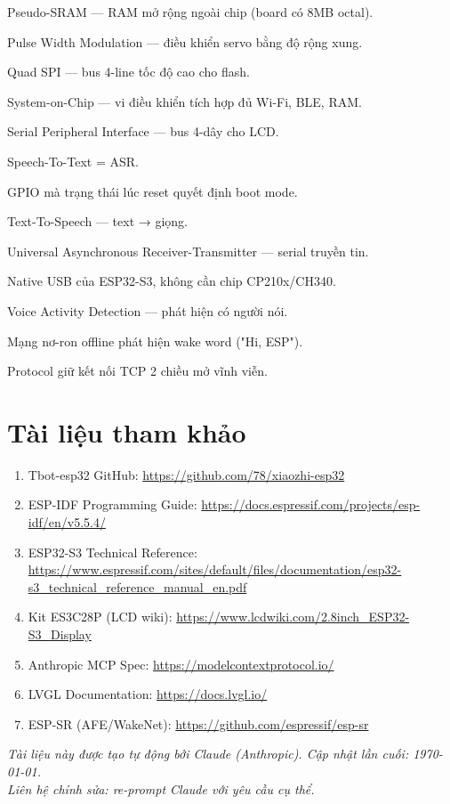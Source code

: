 \documentclass[11pt,a4paper]{article}
\begin{document}
\begin{description}[leftmargin=2.4cm,style=nextline]
  \item[PSRAM] Pseudo-SRAM — RAM mở rộng ngoài chip (board có 8MB octal).
  \item[PWM] Pulse Width Modulation — điều khiển servo bằng độ rộng xung.
  \item[QSPI] Quad SPI — bus 4-line tốc độ cao cho flash.
  \item[SoC] System-on-Chip — vi điều khiển tích hợp đủ Wi-Fi, BLE, RAM.
  \item[SPI] Serial Peripheral Interface — bus 4-dây cho LCD.
  \item[STT] Speech-To-Text = ASR.
  \item[Strap pin] GPIO mà trạng thái lúc reset quyết định boot mode.
  \item[TTS] Text-To-Speech — text → giọng.
  \item[UART] Universal Asynchronous Receiver-Transmitter — serial truyền tin.
  \item[USB-Serial-JTAG] Native USB của ESP32-S3, không cần chip CP210x/CH340.
  \item[VAD] Voice Activity Detection — phát hiện có người nói.
  \item[WakeNet] Mạng nơ-ron offline phát hiện wake word ("Hi, ESP").
  \item[WebSocket] Protocol giữ kết nối TCP 2 chiều mở vĩnh viễn.
\end{description}

\section{Tài liệu tham khảo}
\begin{enumerate}
  \item Tbot-esp32 GitHub: \url{https://github.com/78/xiaozhi-esp32}
  \item ESP-IDF Programming Guide: \url{https://docs.espressif.com/projects/esp-idf/en/v5.5.4/}
  \item ESP32-S3 Technical Reference: \url{https://www.espressif.com/sites/default/files/documentation/esp32-s3_technical_reference_manual_en.pdf}
  \item Kit ES3C28P (LCD wiki): \url{https://www.lcdwiki.com/2.8inch_ESP32-S3_Display}
  \item Anthropic MCP Spec: \url{https://modelcontextprotocol.io/}
  \item LVGL Documentation: \url{https://docs.lvgl.io/}
  \item ESP-SR (AFE/WakeNet): \url{https://github.com/espressif/esp-sr}
\end{enumerate}

\vfill
\begin{center}
\small\itshape Tài liệu này được tạo tự động bởi Claude (Anthropic). Cập nhật lần cuối: \today.\\
Liên hệ chỉnh sửa: re-prompt Claude với yêu cầu cụ thể.
\end{center}
\end{document}
